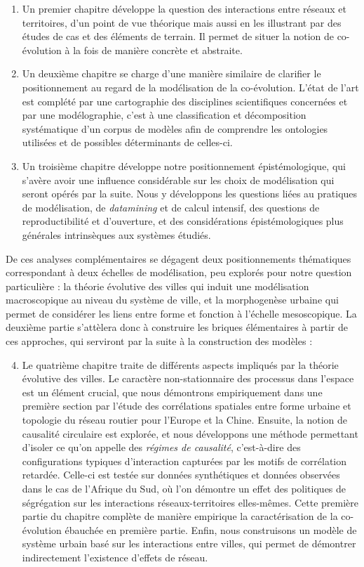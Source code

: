 {\begin{enumerate}
	\item Un premier chapitre développe la question des interactions entre réseaux et territoires, d'un point de vue théorique mais aussi en les illustrant par des études de cas et des éléments de terrain. Il permet de situer la notion de co-évolution à la fois de manière concrète et abstraite.
	\item Un deuxième chapitre se charge d'une manière similaire de clarifier le positionnement au regard de la modélisation de la co-évolution. L'état de l'art est complété par une cartographie des disciplines scientifiques concernées et par une modélographie, c'est à une classification et décomposition systématique d'un corpus de modèles afin de comprendre les ontologies utilisées et de possibles déterminants de celles-ci.
	\item Un troisième chapitre développe notre positionnement épistémologique, qui s'avère avoir une influence considérable sur les choix de modélisation qui seront opérés par la suite. Nous y développons les questions liées au pratiques de modélisation, de \emph{datamining} et de calcul intensif, des questions de reproductibilité et d'ouverture, et des considérations épistémologiques plus générales intrinsèques aux systèmes étudiés. 
\end{enumerate}
De ces analyses complémentaires se dégagent deux positionnements thématiques correspondant à deux échelles de modélisation, peu explorés pour notre question particulière : la théorie évolutive des villes qui induit une modélisation macroscopique au niveau du système de ville, et la morphogenèse urbaine qui permet de considérer les liens entre forme et fonction à l'échelle mesoscopique. La deuxième partie s'attèlera donc à construire les briques élémentaires à partir de ces approches, qui serviront par la suite à la construction des modèles :
\begin{enumerate}\setcounter{enumi}{3}
	\item Le quatrième chapitre traite de différents aspects impliqués par la théorie évolutive des villes. Le caractère non-stationnaire des processus dans l'espace est un élément crucial, que nous démontrons empiriquement dans une première section par l'étude des corrélations spatiales entre forme urbaine et topologie du réseau routier pour l'Europe et la Chine. Ensuite, la notion de causalité circulaire est explorée, et nous développons une méthode permettant d'isoler ce qu'on appelle des \emph{régimes de causalité}, c'est-à-dire des configurations typiques d'interaction capturées par les motifs de corrélation retardée. Celle-ci est testée sur données synthétiques et données observées dans le cas de l'Afrique du Sud, où l'on démontre un effet des politiques de ségrégation sur les interactions réseaux-territoires elles-mêmes. Cette première partie du chapitre complète de manière empirique la caractérisation de la co-évolution ébauchée en première partie. Enfin, nous construisons un modèle de système urbain basé sur les interactions entre villes, qui permet de démontrer indirectement l'existence d'effets de réseau.

\end{enumerate}}
